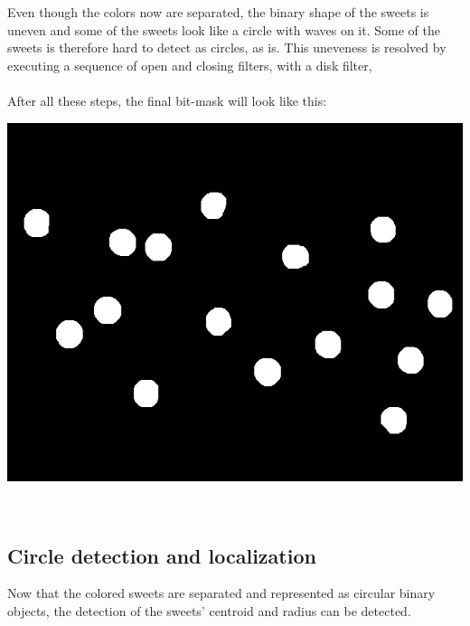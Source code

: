 Even though the colors now are separated, the binary shape of the sweets is uneven and some of the sweets look like a circle with waves on it. Some of the sweets is therefore hard to detect as circles, as is. This uneveness is resolved by executing a sequence of open and closing filters, with a disk filter,
\\

\mbox{}\\
After all these steps, the final bit-mask will look like this:
\\ \newline
\centerline{\includegraphics[scale=0.3]{../results/sweetsA03_blue_sweets.png}}
\mbox{}\\
\subsection{Circle detection and localization}
Now that the colored sweets are separated and represented as circular binary objects, the detection of the sweets' centroid and radius can be detected.
